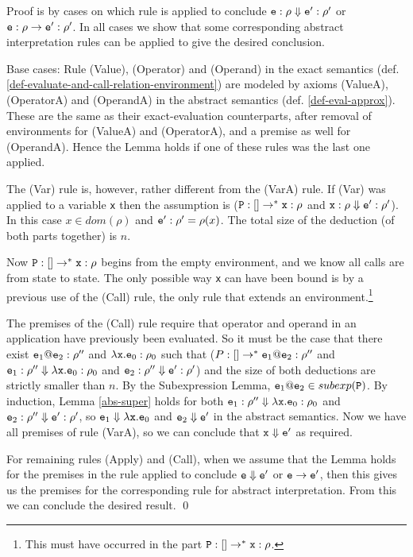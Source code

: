 \documentclass{LMCS}
\newcommand{\eprf}{\qed}
\theoremstyle{definition}\newtheorem{env}[thm]{Environment}
\begin{document}
Proof  is by cases on which rule is applied to conclude 
${\tt e:\rho}\Downarrow{\tt e}':\rho'$ or ${\tt e}:\rho\to{\tt e}':\rho'$. 
In all cases we show that some corresponding abstract interpretation rules  
can be applied to 
give the desired conclusion. 

Base cases: Rule (Value), (Operator) and 
(Operand) in the exact semantics (def. \ref{def-evaluate-and-call-relation-environment}) are modeled by axioms (ValueA), 
(OperatorA) and 
(OperandA) in the abstract semantics (def. \ref{def-eval-approx}). These are the same as their 
exact-evaluation 
counterparts, after removal of  environments for  (ValueA) and 
(OperatorA), 
and a premise as well for (OperandA). 
Hence the Lemma holds if one of these rules was the last one applied.

The (Var) rule is, however, rather different from the (VarA) rule.
If  (Var)  was applied to a variable {\tt x} 
then the assumption is (${\tt P}:[]\to^*{\tt x}:\rho$ and 
${\tt x}:\rho\Downarrow {\tt e}':\rho'$).
In this case $x \in dom(\rho)$ 
and
$ {\tt e}':\rho'= \rho(x)$.   
The total size of the deduction 
(of both parts together) 
is $n$. 

Now ${\tt P}:[]\to^*{\tt x}:\rho$ begins from 
the empty environment, and we know all calls are from state to state.
The only possible way {\tt x} can have been bound is 
by a previous use of the (Call) rule, 
the only rule that extends an environment.\footnote{This must have occurred in the part
${\tt P}:[]\to^*{\tt x}:\rho$.}

The premises of the (Call) rule require that 
operator and operand in an application  have previously been evaluated. So it must be the case that there exist ${\tt e}_1{\tt@e}_2:\rho''$ and $\lambda{\tt x.e}_0:\rho_0$ such that 
($P:[]\to^*{\tt e}_1{\tt@e}_2:\rho''$ and 
${\tt e}_1:\rho''\Downarrow \lambda {\tt x.e}_0:\rho_0$ and 
${\tt e}_2 :\rho''\Downarrow {\tt e}':\rho'$) and the size of both deductions are strictly smaller than $n$. 
By the Subexpression Lemma, ${\tt e}_1{\tt@ e}_2 \in subexp({\tt P})$. 
By induction, 
Lemma \ref{abs-super} holds for both ${\tt e}_1:\rho''\Downarrow \lambda {\tt x.e}_0:\rho_0$ and 
${\tt e}_2 :\rho''\Downarrow {\tt e}':\rho'$, so ${\tt e}_1\Downarrow \lambda {\tt x.e}_0$ and 
${\tt e}_2 \Downarrow {\tt e}'$ in the abstract semantics. 
Now we have all premises of rule (VarA),
so we can conclude that ${\tt x} \Downarrow {\tt e}'$ as required.

For remaining rules (Apply) and (Call), when we assume that the Lemma holds for the premises in 
the rule applied to conclude ${\tt e}\Downarrow{\tt e}'$ or ${\tt e}\to{\tt e}'$, 
then this gives us the premises for the corresponding rule for abstract interpretation. 
From this we can conclude the desired result.
\eprf
\end{document}
